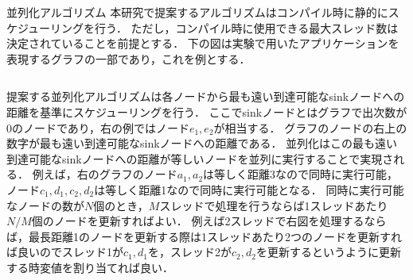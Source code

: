 \documentclass[dvipdfmx,final,t,10pt]{beamer}
\begin{document}
\begin{frame}[fragile]
    \begin{block}{並列化アルゴリズム}
        \vskip 0.25cm
        本研究で提案するアルゴリズムはコンパイル時に静的にスケジューリングを行う．
        ただし，コンパイル時に使用できる最大スレッド数は決定されていることを前提とする．
        下の図は実験で用いたアプリケーションを表現するグラフの一部であり，これを例とする．
        \begin{columns}
            \begin{column}{0.665\textwidth}
                提案する並列化アルゴリズムは各ノードから最も遠い到達可能なsinkノードへの距離を基準にスケジューリングを行う．
                ここでsinkノードとはグラフで出次数が0のノードであり，右の例ではノード$e_1,e_2$が相当する．
                グラフのノードの右上の数字が最も遠い到達可能なsinkノードへの距離である．
                並列化はこの最も遠い到達可能なsinkノードへの距離が等しいノードを並列に実行することで実現される．
                例えば，右のグラフのノード$a_1,a_2$は等しく距離3なので同時に実行可能，ノード$c_1,d_1,c_2,d_2$は等しく距離1なので同時に実行可能となる．
                同時に実行可能なノードの数が$N$個のとき，$M$スレッドで処理を行うならば1スレッドあたり$N/M$個のノードを更新すればよい．
                例えば2スレッドで右図を処理するならば，最長距離1のノードを更新する際は1スレッドあたり2つのノードを更新すれば良いのでスレッド1が$c_1,d_1$を，スレッド2が$c_2,d_2$を更新するというように更新する時変値を割り当てれば良い．

\end{column}
\end{columns}
\end{block}
\end{frame}
\end{document}
